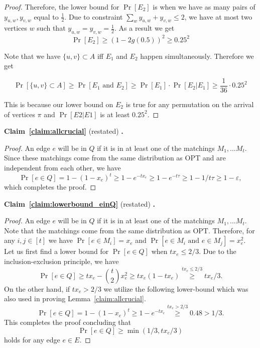 \documentclass[letterpaper,11pt]{article}
\renewcommand{\epsilon}{\varepsilon}
\newcommand{\opt}[0]{\text{OPT}}
\renewcommand{\epsilon}[0]{\ensuremath{\varepsilon}}
\newcommand{\restateclaim}[2]{\noindent \textbf{Claim~#1} (restated) \textbf{.} {\em #2}}
\begin{document}
\begin{proof}
Therefore, the lower bound for 
$\Pr[E_2]$ is when we have as many pairs of $y_{u, w}, y_{v, w}$ equal to $\frac{1}{2}$. Due to constraint $\sum_{w} y_{u, w} + y_{v, w} \leq 2$, we have at most two vertices $w$ such that $y_{u, w} = y_{v, w} = \frac{1}{2}$. As a result we get
\begin{equation}\label{eq:E2lowerboundfinal}
\Pr[E_2] \geq (1 - 2g(0.5))^2 \geq 0.25^2
\end{equation}

Note that we have $\{u,v\}\subset A$ iff $E_1$ and $E_2$ happen simultaneously. Therefore we get

\begin{equation}\label{eq:E2lowerboundfinal}
\Pr[\{u,v\}\subset A] \geq \Pr[\text{$E_1$ and $E_2$}] \geq \Pr[\text{$E_1$}] \cdot \Pr[\text{$E_2 | E_1$}] \geq \frac{1}{36} \cdot 0.25^2
\end{equation}

This is because our lower bound on $E_2$ is true for any permutation on the arrival of vertices $\pi$ and $\Pr[E2|E1]$ is at least $0.25^2$.
\end{proof}


\restateclaim{\ref{claim:allcrucial}}{\claimallcrucial{}}
\begin{proof}
  An edge $e$  will be in $Q$ if it is in at least one of the matchings $M_1, \dots M_t$. 
  Since these matchings come from  the same distribution as $\opt$ and are independent from each other, we have  
  $$\Pr[e\in Q] = 1 - (1 - x_e)^t \geq 1-e^{-tx_e}\geq 1-e^{-t\tau} \geq 1-1/t\tau\geq 1-\epsilon,$$ which completes the proof. 
\end{proof}




\restateclaim{\ref{claim:lowerbound_einQ}}{\claimlowerboundeinQ{}}
\begin{proof}
An edge $e$  will be in $Q$ if it is in at least one of the matchings $M_1, \dots M_t$. 
  Note that the matchings come from  the same distribution as $\opt$. Therefore, for any  $i, j\in [t]$ we have $\Pr[e\in M_i] = x_e$ and  $\Pr[e\in M_i \text{ and } e\in M_j] = x_e^2$.   Let us first find a lower bound for $\Pr[e\in Q]$ when $tx_e\leq2/3$. Due to the inclusion-exclusion principle, we have 
    $$\Pr[e\in Q] \geq  tx_e - \binom{t}{2} x_e^2 \geq tx_e(1-tx_e) \stackrel{tx_e\leq2/3}{\geq}  tx_e/3 .$$ 
 On the other hand, if  $tx_e>2/3$ we  utilize the following lower-bound which was also used in proving Lemma~\ref{claim:allcrucial}. $$\Pr[e\in Q]= 1-(1-x_e)^t \geq 1-e^{-tx_e} \stackrel{tx_e>2/3}{\geq} 0.48  >  1/3.$$ This completes the proof concluding that $$\Pr[e\in Q]\geq \min(1/3, tx_e/3)$$ holds for any edge $e\in E$.
\end{proof}
\end{document}
